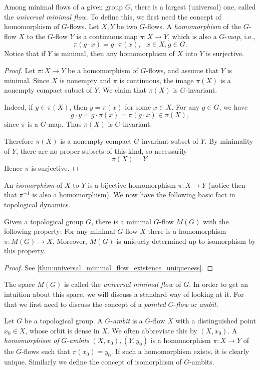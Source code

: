 Among minimal flows of a given group $G$, there is a largest (universal) one, called the {\it universal minimal flow}.  To define this, we first need the concept of homomorphism of $G$-flows.  Let $X,Y$ be two $G$-flows. A {\it homomorphism} of the $G$-flow $X$ to the $G$-flow $Y$ is a continuous map $\pi :X\rightarrow Y$, which is also a $G$-{\it map}, i.e.,
\[
    \pi (g\cdot x)=g\cdot \pi (x),\ \ \ x\in X, g\in G.
\]
Notice that if $Y$ is minimal, then any homomorphism of $X$ into $Y$ is
surjective.
\begin{proof}
    Let $\pi:X\to Y$ be a homomorphism of $G$-flows, and assume that $Y$ is minimal. Since $X$ is nonempty and $\pi$ is continuous, the image $\pi(X)$ is a nonempty compact subset of $Y$. We claim that $\pi(X)$ is $G$-invariant.

    Indeed, if $y\in \pi(X)$, then $y=\pi(x)$ for some $x\in X$. For any $g\in G$, we have
    \[
        g\cdot y=g\cdot \pi(x)=\pi(g\cdot x)\in \pi(X),
    \]
    since $\pi$ is a $G$-map. Thus $\pi(X)$ is $G$-invariant.

    Therefore $\pi(X)$ is a nonempty compact $G$-invariant subset of $Y$. By minimality of $Y$, there are no proper subsets of this kind, so necessarily
    \[
        \pi(X)=Y.
    \]
    Hence $\pi$ is surjective.
\end{proof}
An {\it isomorphism} of $X$ to $Y$ is a bijective homomorphism
$\pi :X\rightarrow Y$ (notice then that $\pi^{-1}$ is also a homomorphism).
We now have the following basic fact in topological dynamics.

\begin{theorem}
    \label{1.1}
    Given a topological group $G$, there is a
    minimal $G$-flow $M(G)$ with the following property:  For any minimal
    $G$-flow $X$ there is a homomorphism $\pi :M(G)\rightarrow X$.  Moreover,
    $M(G)$ is uniquely determined up to isomorphism by this property.
\end{theorem}

\begin{proof}
    See \ref{thm:universal_minimal_flow_existence_uniqueness}.
\end{proof}


The space $M(G)$ is called the {\it universal minimal flow} of $G$.  In order
to get an intuition about this space, we will discuss a standard way of
looking at it.  For that we first need to discuss the concept of a {\it
        pointed} $G$-{\it flow} or {\it ambit}.

Let $G$ be a topological group.  A $G$-{\it ambit} is a $G$-flow $X$ with a
distinguished point $x_0\in X$, whose orbit is dense in $X$.  We often
abbreviate this by $(X,x_0)$.  A {\it homomorphism of} $G$-{\it ambits}
$(X,x_0), (Y,y_0)$ is a homomorphism $\pi :X\to Y$ of the $G$-flows
such that $\pi (x_0)=y_0$. If such a homomorphism exists, it is clearly
unique.  Similarly we define the concept of isomorphism of $G$-ambits.

